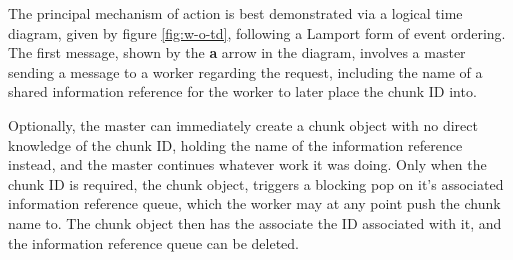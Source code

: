 \documentclass[a4paper,10pt]{article}
\begin{document}
The principal mechanism of action is best demonstrated via a logical time
diagram, given by figure \ref{fig:w-o-td}, following a Lamport form of
event ordering\cite{lamport1978ordering}.
The first message, shown by the \textbf{a} arrow in the diagram, involves a
master sending a message to a worker regarding the request, including the name
of a shared information reference for the worker to later place the chunk ID
into.

Optionally, the master can immediately create a chunk object with no direct
knowledge of the chunk ID, holding the name of the information reference
instead, and the master continues whatever work it was doing.
Only when the chunk ID is required, the chunk object, triggers a blocking pop
on it's associated information reference queue, which the worker may
at any point push the chunk name to.
The chunk object then has the associate the ID associated with it, and the
information reference queue can be deleted.
\end{document}

